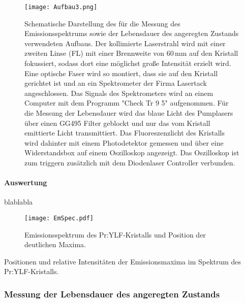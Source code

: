 \begin{figure}[H]
\begin{center}
  \texttt{[image: Aufbau3.png]}
  \caption{Schematische Darstellung des für die Messung des Emissionsspektrums sowie der Lebensdauer des angeregten Zustands verwendeten Aufbaus. Der kollimierte Laserstrahl wird mit einer zweiten Linse (FL) mit einer Brennweite von 60\,mm auf den Kristall fokussiert, sodass dort eine möglichst große Intensität erzielt wird. Eine optische Faser wird so montiert, dass sie auf den Kristall gerichtet ist und an ein Spektrometer der Firma Lasertack angeschlossen. Das Signals des Spektrometers wird an einem Computer mit dem Programm "Check Tr 9 5" aufgenommen. Für die Messung der Lebensdauer wird das blaue Licht des Pumplasers über einen GG495 Filter geblockt und nur das vom Kristall emittierte Licht transmittiert. Das Fluoreszenzlicht des Kristalls wird dahinter mit einem Photodetektor gemessen und über eine Widerstandsbox auf einem Oszilloskop angezeigt. Das Oszilloskop ist zum triggern zusätzlich mit dem Diodenlaser Controller verbunden.}
  \label{img:aufbau3}
\end{center}
\end{figure}




\paragraph{Auswertung}

blablabla

\begin{figure}[H]
\begin{center}
  \texttt{[image: EmSpec.pdf]}
  \caption{Emissionsspektrum des Pr:YLF-Kristalls und Position der deutlichen Maxima.}
  \label{img:EmSpec}
\end{center}
\end{figure}

\begin{table}[htb]
\caption{Positionen und relative Intensitäten der Emissionsmaxima im Spektrum des
Pr:YLF-Kristalls.}

\label{tab:EmSpec}
\end{table}


\FloatBarrier


\subsubsection{Messung der Lebensdauer des angeregten Zustands}

